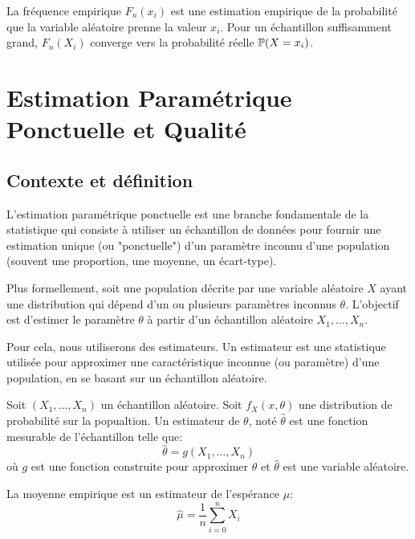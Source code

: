 La fréquence empirique $F_n(x_i)$ est une estimation empirique de la probabilité que la variable 
aléatoire prenne la valeur $x_i$. Pour un échantillon suffisamment grand, $F_n(X_i)$ converge vers 
la probabilité réelle $ \mathbb{P}(X = x_i)$.  


\section{Estimation Paramétrique Ponctuelle et Qualité}

\subsection{Contexte et définition}

L'estimation paramétrique ponctuelle est une branche fondamentale de la statistique qui consiste 
à utiliser un échantillon de données pour fournir une estimation unique (ou "ponctuelle") d'un 
paramètre inconnu d'une population (souvent une proportion, une moyenne, un écart-type). 

\vspace{0.3cm}

Plus formellement, soit une population décrite par une variable aléatoire $X$ ayant une distribution 
qui dépend d'un ou plusieurs paramètres inconnus $\theta$. L'objectif est d'estimer le paramètre $\theta$ 
à partir d'un échantillon aléatoire $X_1, \dots, X_n$. 

Pour cela, nous utiliserons des estimateurs. Un estimateur est une statistique utilisée pour approximer une 
caractéristique inconnue (ou paramètre) d'une population, en se basant sur un échantillon aléatoire.

\begin{definition}[Estimateur]
    Soit $(X_1, \dots, X_n)$ un échantillon aléatoire. Soit $f_X(x,\theta)$ une distribution de 
    probabilité sur la popualtion. Un estimateur de $\theta$, noté $\hat{\theta}$ est une fonction 
    mesurable de l'échantillon telle que: 
        \[ \hat{\theta} = g(X_1, \dots, X_n) \] 
    où $g$ est une fonction construite pour approximer $\theta$ et $\hat{\theta}$ est une variable aléatoire. 
\end{definition}

\begin{example}
    La moyenne empirique est un estimateur de l'espérance $\mu$: 
        \[ \hat{\mu} = \frac{1}{n} \sum_{i=0}^{n} X_i \] 
\end{example}

